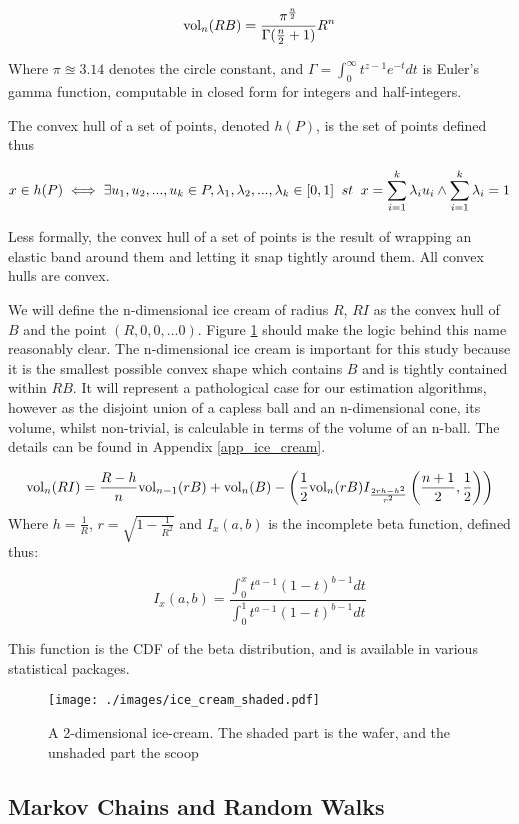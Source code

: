 $$
\mbox{vol}_n(RB) = \frac{\pi^{\frac{n}{2}}}{\Gamma(\frac{n}{2}+1)}R^n
$$

Where $\pi \approxeq 3.14$ denotes the circle constant, and $\Gamma = \int^\infty_0 t^{z-1}e^{-t} dt$ is Euler's gamma function, computable in closed form for integers and half-integers.

The convex hull of a set of points, denoted $h(P)$, is the set of points defined thus

$$
x \in h(P) \iff \exists u_1, u_2,...,u_k \in P, \lambda_1, \lambda_2, ..., \lambda_k  \in [0,1] \;\; st \;\; x = \sum^{k}_{i=1} \lambda_i u_i \wedge \sum^{k}_{i=1} \lambda_i = 1
$$

Less formally, the convex hull of a set of points is the result of wrapping an elastic band around them and letting it snap tightly around them. All convex hulls are convex.

We will define the n-dimensional ice cream of radius $R$, $RI$ as the convex hull of $B$ and the point $(R,0,0,...0)$. Figure \ref{fig_ice_cream} should make the logic behind this name reasonably clear. The n-dimensional ice cream is important for this study because it is the smallest possible convex shape which contains $B$ and is tightly contained within $RB$. It will represent a pathological case for our estimation algorithms, however as the disjoint union of a capless ball and an n-dimensional cone, its volume, whilst non-trivial, is calculable in terms of the volume of an n-ball. The details can be found in Appendix \ref{app_ice_cream}.

$$
\vol_n(RI) = \frac{R-h}{n} \vol_{n-1}(rB) + \vol_n(B) - \left(\frac{1}{2}\vol_n(rB) I_{\frac{2rh-h^2}{r^2}}\left(\frac{n+1}{2}, \frac{1}{2}\right)\right) %
$$
Where $h = \frac{1}{R}$, $r = \sqrt{1-\frac{1}{R^2}}$ and $I_x(a,b)$ is the incomplete beta function, defined thus:

$$
I_x(a,b) = \frac{\int^x_0 t^{a-1}(1-t)^{b-1}dt}{\int^1_0 t^{a-1}(1-t)^{b-1} dt}
$$

This function is the CDF of the beta distribution, and is available in various statistical packages.
\begin{figure}
\centering
\texttt{[image: ./images/ice\_cream\_shaded.pdf]}
\caption{A 2-dimensional ice-cream. The shaded part is the wafer, and the unshaded part the scoop}
\label{fig_ice_cream}
\end{figure}

\subsection{Markov Chains and Random Walks}

